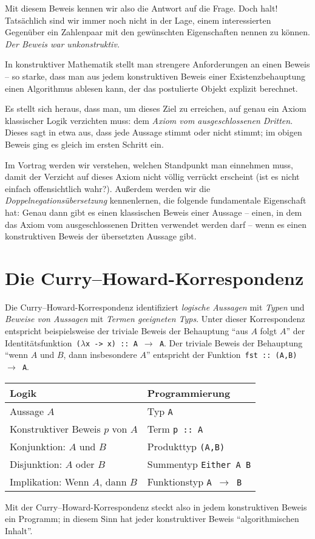 \documentclass[a4paper,ngerman]{scrartcl}
\theoremstyle{plain}
\begin{document}
Mit diesem Beweis kennen wir also die Antwort auf die Frage. Doch halt!
Tatsächlich sind wir immer noch nicht in der Lage, einem interessierten
Gegenüber ein Zahlenpaar mit den gewünschten Eigenschaften nennen zu können.
\emph{Der Beweis war unkonstruktiv.}

In konstruktiver Mathematik stellt man strengere Anforderungen an einen Beweis
-- so starke, dass man aus jedem konstruktiven Beweis einer Existenzbehauptung
einen Algorithmus ablesen kann, der das postulierte Objekt explizit berechnet.

Es stellt sich heraus, dass man, um dieses Ziel zu erreichen, auf genau ein
Axiom klassischer Logik verzichten muss: dem \emph{Axiom vom ausgeschlossenen
Dritten}. Dieses sagt in etwa aus, dass jede Aussage stimmt oder nicht stimmt;
im obigen Beweis ging es gleich im ersten Schritt ein.

Im Vortrag werden wir verstehen, welchen Standpunkt man einnehmen muss, damit
der Verzicht auf dieses Axiom nicht völlig verrückt erscheint (ist es nicht
einfach offensichtlich wahr?). Außerdem werden wir die
\emph{Doppelnegationsübersetzung} kennenlernen, die folgende fundamentale
Eigenschaft hat: Genau dann gibt es einen klassischen Beweis einer Aussage
-- einen, in dem das Axiom vom ausgeschlossenen Dritten verwendet werden darf
-- wenn es einen konstruktiven Beweis der übersetzten Aussage gibt.


\section*{Die Curry--Howard-Korrespondenz}

Die Curry--Howard-Korrespondenz identifiziert \emph{logische Aussagen} mit
\emph{Typen} und \emph{Beweise von Aussagen} mit \emph{Termen geeigneten Typs}.
Unter dieser Korrespondenz entspricht beispielsweise der triviale Beweis der
Behauptung "`aus $A$ folgt $A$"' der Identitätsfunktion~\texttt{($\lambda$x ->
x) :: A $\to$ A}. Der triviale Beweis der Behauptung "`wenn $A$ und $B$, dann
insbesondere $A$"' entspricht der Funktion~\texttt{fst :: (A,B) $\to$ A}.

\begin{center}\begin{tabular}{ll}
  \toprule
  Logik & Programmierung \\\midrule
  Aussage $A$ & Typ \texttt{A} \\
  Konstruktiver Beweis $p$ von $A$ & Term \texttt{p :: A} \\
  Konjunktion: $A$ und $B$ & Produkttyp \texttt{(A,B)} \\
  Disjunktion: $A$ oder $B$ & Summentyp \texttt{Either A B} \\
  Implikation: Wenn $A$, dann $B$ & Funktionstyp \texttt{A $\to$ B} \\
  \bottomrule
\end{tabular}\end{center}

Mit der Curry--Howard-Korrespondenz steckt also in jedem konstruktiven Beweis
ein Programm; in diesem Sinn hat jeder konstruktiver Beweis "`algorithmischen
Inhalt"'.
\end{document}
